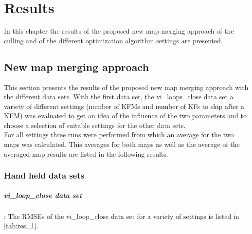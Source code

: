 \chapter{Results}
\label{chap:results}

In this chapter the results of the proposed new map merging approach of the culling and of the different optimization algorithm settings are presented.

\section{New map merging approach}
This section presents the results of the proposed new map merging approach with the different data sets. With the first data set, the vi\_loops\_close data set a variety of different settings (number of \acp{KFM} and number of \acp{KF} to skip after a \ac{KFM}) was evaluated to get an idea of the influence of the two parameters and to choose a selection of suitable settings for the other data sets.\\

For all settings three runs were performed from which an average for the two maps was calculated. This averages for both maps as well as the average of the averaged map results are listed in the following results.

\subsection{Hand held data sets}

\paragraph{vi\_loop\_close data set}: The \acp{RMSE} of the vi\_loop\_close data set for a variety of settings is listed in \autoref{tab:res_1}.


